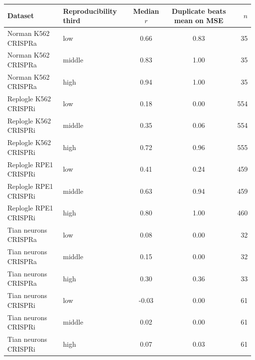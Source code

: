 \begin{tabular}{llccr}
\toprule
Dataset & Reproducibility third & Median $r$ & Duplicate beats mean on MSE & $n$ \\
\midrule
Norman K562 CRISPRa & low & 0.66 & 0.83 & 35 \\
Norman K562 CRISPRa & middle & 0.83 & 1.00 & 35 \\
Norman K562 CRISPRa & high & 0.94 & 1.00 & 35 \\
Replogle K562 CRISPRi & low & 0.18 & 0.00 & 554 \\
Replogle K562 CRISPRi & middle & 0.35 & 0.06 & 554 \\
Replogle K562 CRISPRi & high & 0.72 & 0.96 & 555 \\
Replogle RPE1 CRISPRi & low & 0.41 & 0.24 & 459 \\
Replogle RPE1 CRISPRi & middle & 0.63 & 0.94 & 459 \\
Replogle RPE1 CRISPRi & high & 0.80 & 1.00 & 460 \\
Tian neurons CRISPRa & low & 0.08 & 0.00 & 32 \\
Tian neurons CRISPRa & middle & 0.15 & 0.00 & 32 \\
Tian neurons CRISPRa & high & 0.30 & 0.36 & 33 \\
Tian neurons CRISPRi & low & -0.03 & 0.00 & 61 \\
Tian neurons CRISPRi & middle & 0.02 & 0.00 & 61 \\
Tian neurons CRISPRi & high & 0.07 & 0.03 & 61 \\
\bottomrule
\end{tabular}